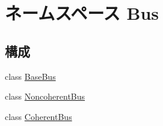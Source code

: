 \hypertarget{namespaceBus}{
\section{ネームスペース Bus}
\label{namespaceBus}
}
\subsection*{構成}
\begin{DoxyCompactItemize}
\item 
class \hyperlink{classBus_1_1BaseBus}{BaseBus}
\item 
class \hyperlink{classBus_1_1NoncoherentBus}{NoncoherentBus}
\item 
class \hyperlink{classBus_1_1CoherentBus}{CoherentBus}
\end{DoxyCompactItemize}
